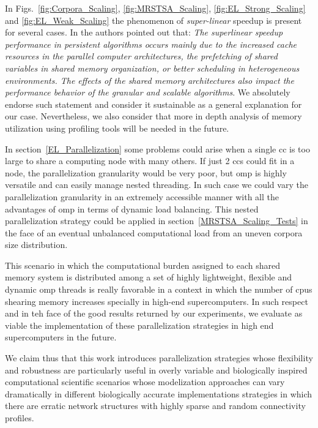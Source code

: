 {In Figs.~\ref{fig:Corpora_Scaling}, \ref{fig:MRSTSA_Scaling}, \ref{fig:EL_Strong_Scaling} and \ref{fig:EL_Weak_Scaling} the phenomenon of \emph{super-linear} speedup is present for several cases. In \cite{7733347} the authors pointed out that: \textit{ The superlinear speedup performance in persistent algorithms occurs mainly due to the increased cache resources in the parallel computer architectures, the prefetching of shared variables in shared memory organization, or better scheduling in heterogeneous environments. The effects of the shared memory architectures also impact the performance behavior of the granular and scalable algorithms}. We absolutely endorse such statement and consider it sustainable as a general explanation for our case. Nevertheless, we also consider that more in depth analysis of memory utilization using profiling tools will be needed in the future.  

In section~\ref{EL_Parallelization} some problems could arise when a single \gls{cc} is too large to share a computing node with many others. If just 2 \glspl{cc} could fit in a node, the parallelization granularity would be very poor, but \gls{omp} is highly versatile and can easily manage nested threading. In such case we could vary the parallelization granularity in an extremely accessible manner with all the advantages of \gls{omp} in terms of dynamic load balancing. This nested parallelization strategy could be applied in section~\ref{MRSTSA_Scaling_Tests} in the face of an eventual unbalanced computational load from an uneven corpora size distribution. 

This scenario in which the computational burden assigned to each shared memory system is distributed among a set of highly lightweight, flexible and dynamic \gls{omp} threads is really favorable in a context in which the number of \glspl{cpu} shearing memory increases specially in high-end supercomputers. In such respect and in teh face of the good results returned by our experiments, we evaluate as viable the implementation of these parallelization strategies in high end supercomputers in the future.

We claim thus that this work introduces parallelization strategies whose flexibility and robustness are particularly useful in overly variable and biologically inspired computational scientific scenarios whose modelization approaches can vary dramatically in different biologically accurate implementations strategies in which there are erratic network structures with highly sparse and random connectivity profiles.
}







